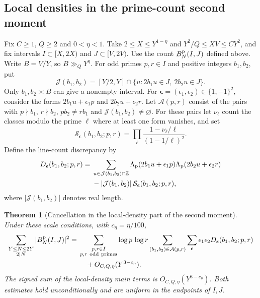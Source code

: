 \documentclass[11pt,a4paper]{article}
\numberwithin{equation}{section}
\newtheorem{theorem}{Theorem}[section]
\begin{document}
\subsection{Local densities in the prime-count second moment}

Fix $C\ge1$, $Q\ge2$ and $0<\eta<1$. Take
$2\le X\le Y^{1-\eta}$ and $Y^2/Q\le XV\le CY^2$,
and fix intervals $I\subset[X,2X)$ and $J\subset[V,2V)$.
Use the count $B_N^{\rm p}(I,J)$ defined above.
Write $B=V/Y$, so $B\gg_Q Y^\eta$. For odd primes
$p,r\in I$ and positive integers $b_1,b_2$, put
\[
 \mathcal J(b_1,b_2)=[Y/2,Y]\cap
   \{u:2b_1u\in J,\ 2b_2u\in J\}.
\]
Only $b_1,b_2\asymp B$ can give a nonempty interval.
For $\boldsymbol\epsilon=(\epsilon_1,\epsilon_2)\in\{1,-1\}^2$,
consider the forms
$2b_1u+\epsilon_1p$ and $2b_2u+\epsilon_2r$.
Let $\mathcal A(p,r)$ consist of the pairs with
$p\nmid b_1$, $r\nmid b_2$, $p b_2\ne r b_1$ and
$\mathcal J(b_1,b_2)\ne\varnothing$.
For these pairs let $\nu_\ell$ count the classes modulo
the prime $\ell$ where at least one form vanishes, and set
\[
 \mathcal S_{\boldsymbol\epsilon}(b_1,b_2;p,r)
       =\prod_\ell\frac{1-\nu_\ell/\ell}{(1-1/\ell)^2}.
\]
Define the line-count discrepancy by
\begin{align*}
 D_{\boldsymbol\epsilon}(b_1,b_2;p,r)
 ={}& \sum_{u\in\mathcal J(b_1,b_2)\cap\mathbb Z}
      \Lambda_{\rm p}(2b_1u+\epsilon_1p)
      \Lambda_{\rm p}(2b_2u+\epsilon_2r)\\
 &-|\mathcal J(b_1,b_2)|\,
     \mathcal S_{\boldsymbol\epsilon}(b_1,b_2;p,r),
\end{align*}
where $|\mathcal J(b_1,b_2)|$ denotes real length.

\begin{theorem}[Cancellation in the local-density part of the second moment]
\label{thm:criticalgridvariance}
Under these scale conditions, with $c_\eta=\eta/100$,
\begin{align}
 \sum_{\substack{Y\le N\le2Y\\2\mid N}} |B_N^{\rm p}(I,J)|^2
 ={}& \sum_{\substack{p,r\in I\\p,r\ {\rm odd\ primes}}}
           \log p\,\log r
     \sum_{(b_1,b_2)\in\mathcal A(p,r)}
     \sum_{\boldsymbol\epsilon}
        \epsilon_1\epsilon_2
           D_{\boldsymbol\epsilon}(b_1,b_2;p,r)\notag\\
 &\quad+O_{C,Q,\eta}(Y^{3-c_\eta}).
 \label{eq:criticalgridvariance}
\end{align}
The signed sum of the local-density main terms is
$O_{C,Q,\eta}(Y^{3-c_\eta})$. Both estimates hold
unconditionally and are uniform in the endpoints of $I,J$.
\end{theorem}
\end{document}
